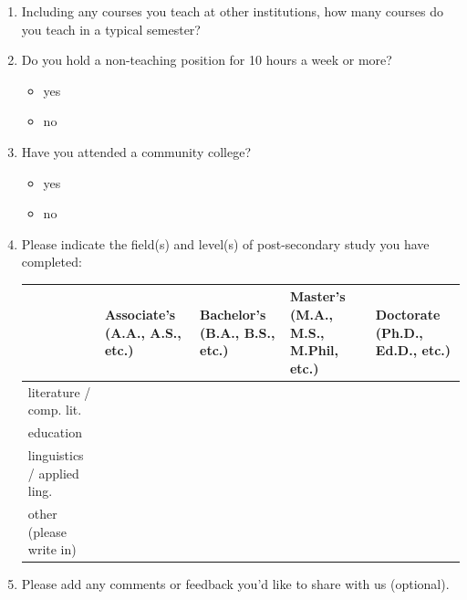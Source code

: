 \documentclass[letterpaper,10pt]{article}
\begin{document}
\begin{enumerate}[resume]
\item Including any courses you teach at other institutions, how many courses do you teach in a typical semester?\\

\underline{\hspace{3.5in}}

\item Do you hold a non-teaching position for 10 hours a week or more?
\vspace{-0.1in}\begin{multicols}{2}
\begin{itemize}
	\item yes
	\item no
\end{itemize}
\end{multicols}


\item Have you attended a community college?
\vspace{-0.1in}\begin{multicols}{2}
\begin{itemize}
	\item yes
	\item no
\end{itemize}
\end{multicols}


\item Please indicate the field(s) and level(s) of post-secondary study you have completed:\\[0.05in]
\renewcommand{\arraystretch}{1.5}
\begin{tabular}{|p{1.5in}|p{1.0in}|p{1.0in}|p{1.1in}|p{1.1in}|}
\hline
 & Associate's (A.A., A.S., etc.) & Bachelor’s (B.A., B.S., etc.) & Master’s (M.A., M.S., M.Phil, etc.) & Doctorate (Ph.D., Ed.D., etc.)\\
\hline
literature / comp. lit. & & & &\\
\hline
education & & & &\\
\hline
linguistics / applied ling. & & & &\\
\hline
\multirow{2}{*}{other (please write in)} & & & &\\
 & & & &\\
\hline
\end{tabular}

\vfill
\item Please add any comments or feedback you'd like to share with us (optional).\\
\fbox{\parbox{6in}{\textcolor{white}{.}\\[0.4in]}}

\end{enumerate}
\end{document}
